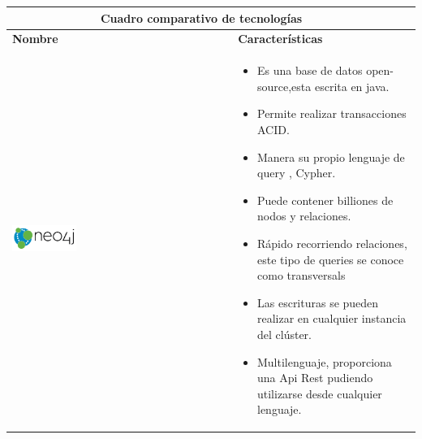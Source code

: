 	\begin{table}[b!]
    \centering
      \begin{tabular}{|p{2cm}|ll}
        \hline
        \multicolumn{2}{|c|}{{\bf Cuadro comparativo de tecnologías}} \\ 
        \hline
          \multicolumn{1}{|p{4cm}|}{{\bf Nombre}} & 
		  \multicolumn{1}{p{10cm}|}{{\bf Características}}\\

        \hline
          \multicolumn{1}{|p{5cm}|}{\includegraphics[width=0.3\textwidth]{images/neo4j}} & 
          \multicolumn{2}{p{10cm}|}{\begin{itemize}
          \vspace{-15mm}
        \item Es una base de datos open-source,esta escrita en java.
        \item Permite realizar transacciones ACID.
        \item Manera su propio lenguaje de query , Cypher.
        \item Puede contener billiones de nodos y relaciones.
        \item Rápido recorriendo relaciones, este tipo de queries se conoce como transversals
        \item Las escrituras se pueden realizar en cualquier instancia del clúster.
        \item Multilenguaje, proporciona una Api Rest pudiendo utilizarse desde cualquier lenguaje.
      \end{itemize}} \\
         

\end{tabular}
\end{table}
